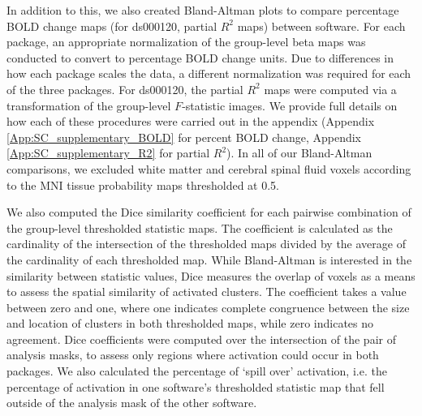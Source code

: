 In addition to this, we also created Bland-Altman plots to compare percentage BOLD change maps (for ds000120, partial $R^{2}$ maps) between software. For each package, an appropriate normalization of the group-level beta maps was conducted to convert to percentage BOLD change units. Due to differences in how each package scales the data, a different normalization was required for each of the three packages. For ds000120, the partial $R^{2}$ maps were computed via a transformation of the group-level $F$-statistic images. We provide full details on how each of these procedures were carried out in the appendix (Appendix \ref{App:SC_supplementary_BOLD} for percent BOLD change, Appendix \ref{App:SC_supplementary_R2} for partial $R^{2}$). In all of our Bland-Altman comparisons, we excluded white matter and cerebral spinal fluid voxels according to the MNI tissue probability maps thresholded at 0.5. 

We also computed the Dice similarity coefficient for each pairwise combination of the group-level thresholded statistic maps. The coefficient is calculated as the cardinality of the intersection of the thresholded maps divided by the average of the cardinality of each thresholded map. While Bland-Altman is interested in the similarity between statistic values, Dice measures the overlap of voxels as a means to assess the spatial similarity of activated clusters. The coefficient takes a value between zero and one, where one indicates complete congruence between the size and location of clusters in both thresholded maps, while zero indicates no agreement. Dice coefficients were computed over the intersection of the pair of analysis masks, to assess only regions where activation could occur in both packages. We also calculated the percentage of `spill over' activation, i.e. the percentage of activation in one software's thresholded statistic map that fell outside of the analysis mask of the other software. 

